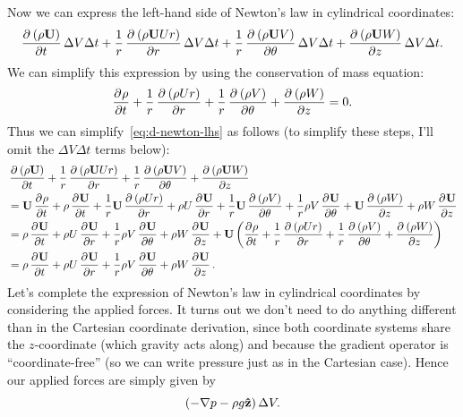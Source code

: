 \documentclass{article}
\def\*#1{\mathbf{#1}}
\newcommand{\zhat}{\mathbf{\hat{z}}}
\begin{document}
%
Now we can express the left-hand side of Newton's law in cylindrical
coordinates:
%
\begin{equation}
    \dpd{\del{\rho \*U}}{t} \Delta V \Delta t
    + \frac{1}{r} \dpd{\del{\rho \*U U r}}{r} \Delta V \Delta t
    + \frac{1}{r} \dpd{\del{\rho \*U V}}{\theta} \Delta V \Delta t
    + \dpd{\del{\rho \*U W}}{z} \Delta V \Delta t
    .
    \label{eq:d-newton-lhs}
\end{equation}
%
We can simplify this expression by using the conservation of mass
equation:
%
\begin{equation*}
    \dpd{\rho}{t}
        + \frac{1}{r} \dpd{\del{\rho U r}}{r}
        + \frac{1}{r} \dpd{\del{\rho V}}{\theta}
        + \dpd{\del{\rho W}}{z}
        = 0
        .
\end{equation*}
%
Thus we can simplify~\eqref{eq:d-newton-lhs} as follows (to simplify
these steps, I'll omit the $\Delta V \Delta t$ terms below):
%
\begin{align*}
    &\dpd{\del{\rho \*U}}{t}
    + \frac{1}{r} \dpd{\del{\rho \*U U r}}{r}
    + \frac{1}{r} \dpd{\del{\rho \*U V}}{\theta}
    + \dpd{\del{\rho \*U W}}{z}
    \\
    &=
    \*U \dpd{\rho}{t}
    + \rho \dpd{\*U}{t}
    + \frac{1}{r} \*U \dpd{\del{\rho U r}}{r}
    + \rho U \dpd{\*U}{r}
    + \frac{1}{r} \*U \dpd{\del{\rho V}}{\theta}
    + \frac{1}{r} \rho V \dpd{\*U}{\theta}
    + \*U \dpd{\del{\rho W}}{z}
    + \rho W \dpd{\*U}{z}
    \\
    &=
    \rho \dpd{\*U}{t}
    + \rho U \dpd{\*U}{r}
    + \frac{1}{r} \rho V \dpd{\*U}{\theta}
    + \rho W \dpd{\*U}{z}
    + \*U \del{
        \dpd{\rho}{t}
        + \frac{1}{r} \dpd{\del{\rho U r}}{r}
        + \frac{1}{r} \dpd{\del{\rho V}}{\theta}
        + \dpd{\del{\rho W}}{z}
    }
    \\
    &=
    \rho \dpd{\*U}{t}
    + \rho U \dpd{\*U}{r}
    + \frac{1}{r} \rho V \dpd{\*U}{\theta}
    + \rho W \dpd{\*U}{z}
    .
\end{align*}
%
Let's complete the expression of Newton's law in cylindrical coordinates
by considering the applied forces. It turns out we don't need to do
anything different than in the Cartesian coordinate derivation, since
both coordinate systems share the $z$-coordinate (which gravity acts
along) and because the gradient operator is ``coordinate-free'' (so we
can write pressure just as in the Cartesian case). Hence our applied
forces are simply given by
%
\begin{equation*}
    \del{- \nabla p - \rho g \zhat} \Delta V
    .
\end{equation*}
\end{document}
